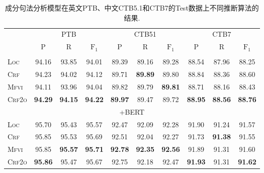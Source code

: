 \begin{table}[tb!]
  \centering
  \caption{成分句法分析模型在英文PTB、中文CTB5.1和CTB7的Test数据上不同推断算法的结果.}
  \begin{tabular}{lccccccccc}
    \toprule
                   & \multicolumn{3}{c}{PTB} & \multicolumn{3}{c}{CTB51} & \multicolumn{3}{c}{CTB7}                                                                                                       \\
                   & $\mathrm{P}$            & $\mathrm{R}$              & $\mathrm{F}_1$           & $\mathrm{P}$   & $\mathrm{R}$   & $\mathrm{F}_1$ & $\mathrm{P}$   & $\mathrm{R}$   & $\mathrm{F}_1$ \\[2pt]
    \midrule
    \\[-15pt]
    \textsc{Loc}   & 94.16                   & 93.85                     & 94.01                    & 89.39          & 89.16          & 89.28          & 88.54          & 87.96          & 88.25          \\
    \textsc{Crf}   & 94.23                   & 94.02                     & 94.12                    & 89.71          & \textbf{89.89} & 89.80          & 88.84          & 88.36          & 88.60          \\
    \textsc{Mfvi}  & 94.11                   & 93.96                     & 94.04                    & 89.82          & 89.79          & \textbf{89.81} & 88.71          & 88.16          & 88.43          \\
    \textsc{Crf2o} & \textbf{94.29}          & \textbf{94.15}            & \textbf{94.22}           & \textbf{89.97} & 89.47          & 89.72          & \textbf{88.95} & \textbf{88.56} & \textbf{88.76} \\
    \multicolumn{10}{c}{+BERT}                                                                                                                                                                            \\[3pt]
    \textsc{Loc}   & 95.70                   & 95.43                     & 95.57                    & 92.47          & 92.09          & 92.28          & 91.90          & 91.24          & 91.57          \\
    \textsc{Crf}   & 95.85                   & 95.53                     & 95.69                    & 92.51          & 92.04          & 92.27          & 91.73          & \textbf{91.38} & 91.55          \\
    \textsc{Mfvi}  & 95.85                   & \textbf{95.57}            & \textbf{95.71}           & \textbf{92.78} & \textbf{92.35} & \textbf{92.56} & 91.89          & 91.31          & 91.60          \\
    \textsc{Crf2o} & \textbf{95.86}          & 95.47                     & 95.67                    & 92.75          & 92.18          & 92.47          & \textbf{91.93} & 91.31          & \textbf{91.62} \\
    \bottomrule
  \end{tabular}
  \label{table:vi-con-test}
\end{table}


